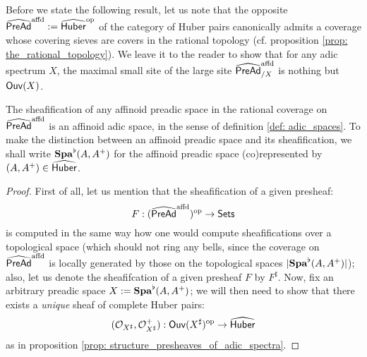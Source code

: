                     \begin{remark}
                        Before we state the following result, let us note that the opposite $\widehat{\mathsf{Pre}\mathsf{Ad}}^{\mathrm{affd}} := \widehat{\mathsf{Huber}}^{\mathrm{op}}$ of the category of Huber pairs canonically admits a coverage whose covering sieves are covers in the rational topology (cf. proposition \ref{prop: the_rational_topology}). We leave it to the reader to show that for any adic spectrum $X$, the maximal small site of the large site $\widehat{\mathsf{Pre}\mathsf{Ad}}^{\mathrm{affd}}_{/X}$ is nothing but $\mathsf{Ouv}(X)$.
                    \end{remark}
                    \begin{theorem} \label{theorem: sheafifying_pre_adic_spaces}
                        The sheafification of any affinoid preadic space in the rational coverage on $\widehat{\mathsf{Pre}\mathsf{Ad}}^{\mathrm{affd}}$ is an affinoid adic space, in the sense of definition \ref{def: adic_spaces}. To make the distinction between an affinoid preadic space and its sheafification, we shall write $\mathbf{Spa}^{\flat}(A, A^+)$ for the affinoid preadic space (co)represented by $(A, A^+) \in \widehat{\mathsf{Huber}}$.
                    \end{theorem}
                        \begin{proof}
                            First of all, let us mention that the sheafification of a given presheaf:
                                $$F: (\widehat{\mathsf{Pre}\mathsf{Ad}}^{\mathrm{affd}})^{\mathrm{op}} \to \mathsf{Sets}$$
                            is computed in the same way how one would compute sheafifications over a topological space (which should not ring any bells, since the coverage on $\widehat{\mathsf{Pre}\mathsf{Ad}}^{\mathrm{affd}}$ is locally generated by those on the topological spaces $|\mathbf{Spa}^{\flat}(A, A^+)|$); also, let us denote the sheafifcation of a given presheaf $F$ by $F^{\sharp}$. Now, fix an arbitrary preadic space $X := \mathbf{Spa}^{\flat}(A, A^+)$; we will then need to show that there exists a \textit{unique} sheaf of complete Huber pairs:
                                $$(\mathcal{O}_{X^{\sharp}}, \mathcal{O}_{X^{\sharp}}^+): \mathsf{Ouv}(X^{\sharp})^{\mathrm{op}} \to \widehat{\mathsf{Huber}}$$
                            as in proposition \ref{prop: structure_presheaves_of_adic_spectra}. 
                        \end{proof}
                    \begin{example}
                        
                    \end{example}
                

